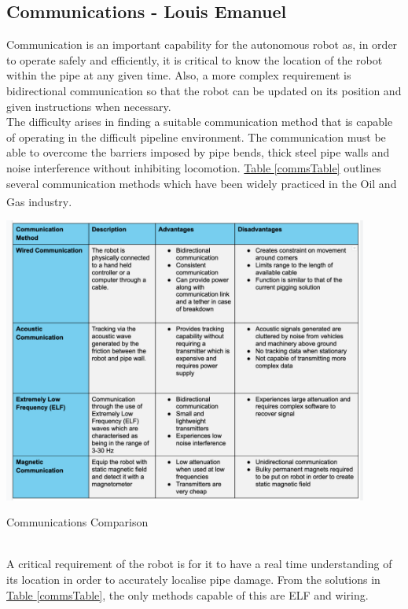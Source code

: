 \documentclass[11pt]{article}		%
\newcommand{\supercite}[1]{\textsuperscript{\cite{#1}}}		%
\newcommand{\tableref}[1]{\hyperref[#1]{Table \ref*{#1}}}     %
\begin{document}
		\subsection[Communications]{Communications - Louis Emanuel}
        \label{commmshardware}
			Communication is an important capability for the autonomous robot as, in order to operate safely and efficiently, it is critical to know the location of the robot within the pipe at any given time. 
			Also, a more complex requirement is bidirectional communication so that the robot can be updated on its position and given instructions when necessary. 
			\\
            \hspace*{2ex}The difficulty arises in finding a suitable communication method that is capable of operating in the difficult pipeline environment. 
		    The communication must be able to overcome the barriers imposed by pipe bends, thick steel pipe walls and noise interference without inhibiting locomotion.
		    \tableref{commsTable} outlines several communication methods which have been widely practiced in the Oil and Gas industry\supercite{acoustic2020}.
	        \begin{table}[h]
				\centering
				\includegraphics[width=0.9\textwidth]{commscomparison}
				\caption{Communications Comparison}
				\label{commsTable}
			\end{table}
			\\
            \hspace*{2ex}A critical requirement of the robot is for it to have a real time understanding of its location in order to accurately localise pipe damage. 
	     	From the solutions in \tableref{commsTable}, the only methods capable of this are ELF and wiring. 
\end{document}
